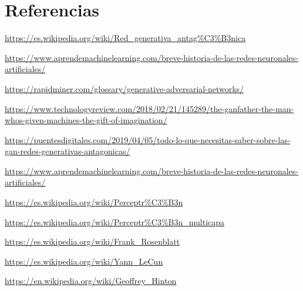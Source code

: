 \documentclass[a4paper]{article}
\begin{document}
\section{Referencias}

{\ttfamily
\href{https://es.wikipedia.org/wiki/Red_generativa_antagónica}{https://es.wikipedia.org/wiki/Red\_generativa\_antag\%C3\%B3nica}}

{\ttfamily
\url{https://www.aprendemachinelearning.com/breve-historia-de-las-redes-neuronales-artificiales/}}

{\ttfamily
\url{https://rapidminer.com/glossary/generative-adversarial-networks/}}

{\ttfamily
\url{https://www.technologyreview.com/2018/02/21/145289/the-ganfather-the-man-whos-given-machines-the-gift-of-imagination/}}

\url{https://puentesdigitales.com/2019/04/05/todo-lo-que-necesitas-saber-sobre-las-gan-redes-generativas-antagonicas/}

\url{https://www.aprendemachinelearning.com/breve-historia-de-las-redes-neuronales-artificiales/}

\url{https://es.wikipedia.org/wiki/Perceptr\%C3\%B3n}

\url{https://es.wikipedia.org/wiki/Perceptr\%C3\%B3n_multicapa}

\url{https://es.wikipedia.org/wiki/Frank_Rosenblatt}

\url{https://es.wikipedia.org/wiki/Yann_LeCun}

\url{https://en.wikipedia.org/wiki/Geoffrey_Hinton}
\end{document}
